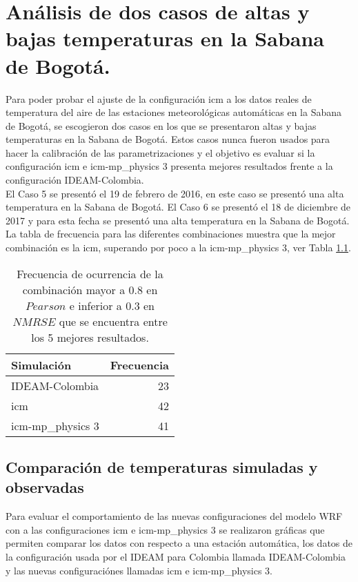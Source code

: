 \appendix
\clearpage
\addappheadtotoc
\appendixpage
\chapter{Análisis de dos casos de altas y bajas temperaturas en la Sabana de Bogotá.}

Para poder probar el ajuste de la configuración icm a los datos reales de temperatura del aire de las estaciones meteorológicas automáticas en la Sabana de Bogotá, se escogieron dos casos en los que se presentaron altas y bajas temperaturas en la Sabana de Bogotá. Estos casos nunca fueron usados para hacer la calibración de las parametrizaciones y el objetivo es evaluar si la configuración icm e icm-mp\_physics 3 presenta mejores resultados frente a la configuración IDEAM-Colombia.\\

El Caso 5 se presentó el 19 de febrero de 2016, en este caso se presentó una alta temperatura en la Sabana de Bogotá. El Caso 6 se presentó el 18 de diciembre de 2017 y para esta fecha se presentó una alta temperatura en la Sabana de Bogotá.\\

La tabla de frecuencia para las diferentes combinaciones muestra que la mejor combinación es la icm, superando por poco a la icm-mp\_physics 3, ver Tabla \ref{tab_anex_56}.


\begin{table}[H]
\centering
\caption{Frecuencia de ocurrencia de la combinación mayor a 0.8 en $Pearson$ e inferior a 0.3 en $NMRSE$ que se encuentra entre los 5 mejores resultados.}
\label{tab_anex_56} %
\begin{tabular}{lr}
\toprule
Simulación & Frecuencia \\
\midrule
IDEAM-Colombia &     23 \\
icm      &     42 \\
icm-mp\_physics 3    &     41 \\
\bottomrule
\end{tabular}
\end{table}

\section{Comparación de temperaturas simuladas y observadas}

Para evaluar el comportamiento de las nuevas configuraciones del modelo WRF con a las configuraciones icm e icm-mp\_physics 3 se realizaron gráficas que permiten comparar los datos con respecto a una estación automática, los datos de la configuración usada por el IDEAM para Colombia llamada IDEAM-Colombia y las nuevas configuraciónes llamadas icm e icm-mp\_physics 3.\\

